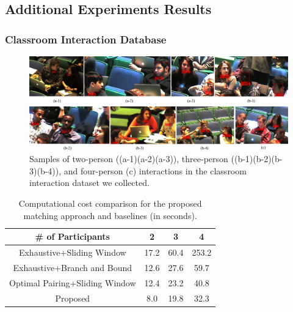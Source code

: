 \subsection{Additional Experiments Results}

\subsubsection{Classroom Interaction Database}

\begin{figure}[h]
\begin{center}
\includegraphics[scale=1.2]{dataset.png}
\end{center}
\caption{Samples of two-person ((a-1)(a-2)(a-3)), three-person ((b-1)(b-2)(b-3)(b-4)), and four-person (c) interactions in the classroom interaction dataset we collected.}
\label{dataset}
\end{figure}

\begin{table}[h]
\centering \caption{Computational cost comparison for the proposed matching approach and baselines (in seconds).}
\footnotesize{
\begin{tabular}{|c|c|c|c|}
\hline    \# of Participants &  2  &  3  &  4   \\
\hline   Exhaustive+Sliding Window & 17.2   & 60.4   & 253.2   \\
\hline  Exhaustive+Branch and Bound &  12.6 &  27.6  &   59.7 \\
\hline  Optimal Pairing+Sliding Window & 12.4  & 23.2   &  40.8  \\
\hline  Proposed & 8.0  &  19.8  &  32.3  \\
\hline 
\end{tabular}
}
\label{computecost}
\end{table}

